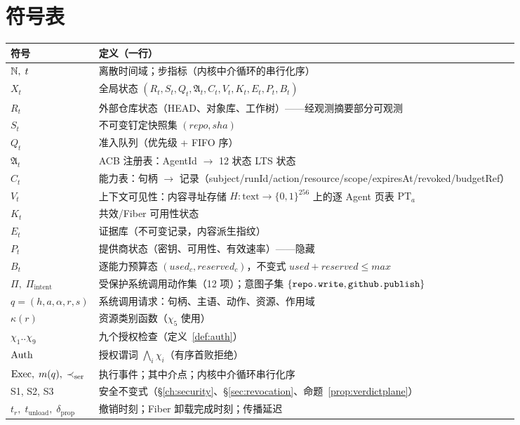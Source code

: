\chapter{符号表}\label{app:symbols}

\small
\begin{longtable}{@{}>{\raggedright\arraybackslash}p{3.4cm}>{\raggedright\arraybackslash}p{11.4cm}@{}}
\toprule
\textbf{符号} & \textbf{定义（一行）}\\
\midrule
\endhead
$\mathbb{N},\;t$ & 离散时间域；步指标（内核中介循环的串行化序）\\
$X_t$ & 全局状态 $(R_t,S_t,Q_t,\mathfrak{A}_t,C_t,V_t,K_t,E_t,P_t,B_t)$\\
$R_t$ & 外部仓库状态（HEAD、对象库、工作树）——经观测摘要部分可观测\\
$S_t$ & 不可变钉定快照集 $(repo,sha)$\\
$Q_t$ & 准入队列（优先级 + FIFO 序）\\
$\mathfrak{A}_t$ & ACB 注册表：AgentId $\to$ 12 状态 LTS 状态\\
$C_t$ & 能力表：句柄 $\to$ 记录（subject/runId/action/resource/scope/expiresAt/revoked/budgetRef）\\
$V_t$ & 上下文可见性：内容寻址存储 $H:\text{text}\to\{0,1\}^{256}$ 上的逐 Agent 页表 $\mathrm{PT}_a$\\
$K_t$ & 共效/Fiber 可用性状态\\
$E_t$ & 证据库（不可变记录，内容派生指纹）\\
$P_t$ & 提供商状态（密钥、可用性、有效速率）——隐藏\\
$B_t$ & 逐能力预算态 $(used_c,reserved_c)$，不变式 $used+reserved\le max$\\
$\Pi,\;\Pi_{\mathrm{intent}}$ & 受保护系统调用动作集（12 项）；意图子集 $\{\texttt{repo.write},\texttt{github.publish}\}$\\
$q=(h,a,\alpha,r,s)$ & 系统调用请求：句柄、主语、动作、资源、作用域\\
$\kappa(r)$ & 资源类别函数（$\chi_5$ 使用）\\
$\chi_1..\chi_9$ & 九个授权检查（定义~\ref{def:auth}）\\
$\operatorname{Auth}$ & 授权谓词 $\bigwedge_i\chi_i$（有序首败拒绝）\\
$\operatorname{Exec},\;m(q),\;\prec_{\mathrm{ser}}$ & 执行事件；其中介点；内核中介循环串行化序\\
S1, S2, S3 & 安全不变式（\S\ref{ch:security}、\S\ref{sec:revocation}、命题~\ref{prop:verdictplane}）\\
$t_r,\;t_{\mathrm{unload}},\;\delta_{\mathrm{prop}}$ & 撤销时刻；Fiber 卸载完成时刻；传播延迟\\

\end{longtable}
